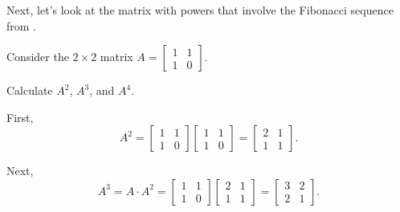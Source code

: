 Next, let's look at the matrix with powers that involve the Fibonacci sequence from .

\begin{exam}
\label{exam_fib_matrix}
    Consider the $2 \times 2$ matrix $A= \left[ \begin{array}{cc} 1 & 1\\ 1 & 0 \end{array} \right]$.  
        \begin{apart}
            \item Calculate $A^2$, $A^3$, and $A^4$.
                \begin{soln}
                    First,
                        $$A^2= \left[ \begin{array}{cc} 1 & 1\\ 1 & 0 \end{array} \right]\left[ \begin{array}{cc} 1 & 1\\ 1 & 0 \end{array} \right]= \left[ \begin{array}{cc} 2 & 1\\ 1 & 1 \end{array} \right].$$

                    Next,
                        $$A^3= A\cdot A^2=\left[ \begin{array}{cc} 1 & 1\\ 1 & 0 \end{array} \right]\left[ \begin{array}{cc} 2 & 1\\ 1 & 1 \end{array} \right]= \left[ \begin{array}{cc} 3 & 2\\ 2 & 1 \end{array} \right].$$


\end{soln}
\end{apart}
\end{exam}

